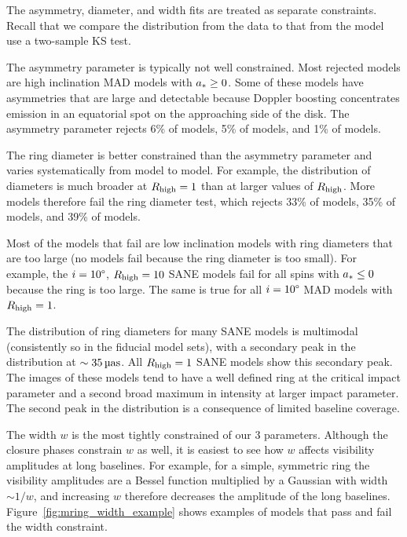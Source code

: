 The \mring asymmetry, diameter, and width fits are treated as separate constraints.
Recall that we compare the distribution from the data to that from the model use a two-sample KS test.

The asymmetry parameter is typically not well constrained.
Most rejected models are high inclination MAD models with $a_* \ge 0$.
Some of these models have asymmetries that are large and detectable because Doppler boosting concentrates emission in an equatorial spot on the approaching side of the disk.
The asymmetry parameter rejects 6\% of \kharma models, 5\% of \bhac models, and 1\% of \hamr models.

The ring diameter is better constrained than the asymmetry parameter and varies systematically from model to model.
For example, the distribution of diameters is much broader at $R_\mathrm{high} = 1$ than at larger values of $R_\mathrm{high}$.
More models therefore fail the ring diameter test, which rejects 33\% of \kharma models, 35\% of \bhac models, and 39\% of \hamr models.

Most of the models that fail are low inclination models with ring diameters that are too large (no models fail because the ring diameter is too small).
For example, the $i = 10\degree$, $R_\mathrm{high} = 10$ SANE models fail for all spins with $a_* \le 0$ because the ring is too large.
The same is true for all $i = 10\degree$ MAD models with $R_\mathrm{high} = 1$.

The distribution of ring diameters for many SANE models is multimodal (consistently so in the fiducial model sets), with a secondary peak in the distribution at $\sim 35\uas$.
All $R_\mathrm{high} = 1$ SANE models show this secondary peak.
The images of these models tend to have a well defined ring at the critical impact parameter and a second broad maximum in intensity at larger impact parameter.
The second peak in the distribution is a consequence of limited baseline coverage.

The \mring width $w$ is the most tightly constrained of our 3 parameters.
Although the closure phases constrain $w$ as well, it is easiest to see how $w$ affects visibility amplitudes at long baselines.
For example, for a simple, symmetric ring the visibility amplitudes are a Bessel function multiplied by a Gaussian with width $\sim 1/w$, and increasing $w$ therefore decreases the amplitude of the long baselines.
Figure~\ref{fig:mring_width_example} shows examples of models that pass and fail the \mring width constraint.

